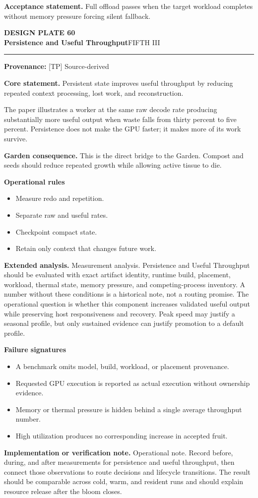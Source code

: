 \documentclass[10pt,letterpaper,oneside]{article}
\newcommand{\prov}[1]{\textcolor{gardenBlue}{\sffamily\footnotesize\textbf{Provenance:} #1}}
\newcommand{\platetitle}[3]{%
  \begin{minipage}[t][0.54in][t]{\textwidth}
  {\sffamily\bfseries\color{gardenDeep}\fontsize{9}{10}\selectfont DESIGN PLATE #1}\\[-1pt]
  {\sffamily\bfseries\color{gardenInk}\fontsize{16.5}{18}\selectfont #2}\hfill{\sffamily\color{gardenGreen}\large #3}
  \end{minipage}\vspace{-2pt}\hrule\vspace{5pt}}
\begin{document}
\begin{acceptbox}
\textbf{Acceptance statement.} Full offload passes when the target workload completes without memory pressure forcing silent fallback.
\end{acceptbox}
\newpage
\platetitle{60}{Persistence and Useful Throughput}{FIFTH III}
\prov{[TP] Source-derived}
\fontsize{8.85}{10.45}\selectfont
\begin{corebox}
\textbf{Core statement.} Persistent state improves useful throughput by reducing repeated context processing, lost work, and reconstruction.
\end{corebox}
The paper illustrates a worker at the same raw decode rate producing substantially more useful output when waste falls from thirty percent to five percent. Persistence does not make the GPU faster; it makes more of its work survive.

\textbf{Garden consequence.} This is the direct bridge to the Garden. Compost and seeds should reduce repeated growth while allowing active tissue to die.

\textbf{Operational rules}
\begin{itemize}
\item Measure redo and repetition.
\item Separate raw and useful rates.
\item Checkpoint compact state.
\item Retain only context that changes future work.
\end{itemize}
\textbf{Extended analysis.} Measurement analysis. Persistence and Useful Throughput should be evaluated with exact artifact identity, runtime build, placement, workload, thermal state, memory pressure, and competing-process inventory. A number without these conditions is a historical note, not a routing promise. The operational question is whether this component increases validated useful output while preserving host responsiveness and recovery. Peak speed may justify a seasonal profile, but only sustained evidence can justify promotion to a default profile.

\textbf{Failure signatures}
\begin{itemize}
\item A benchmark omits model, build, workload, or placement provenance.
\item Requested GPU execution is reported as actual execution without ownership evidence.
\item Memory or thermal pressure is hidden behind a single average throughput number.
\item High utilization produces no corresponding increase in accepted fruit.
\end{itemize}
\textbf{Implementation or verification note.} Operational note. Record before, during, and after measurements for persistence and useful throughput, then connect those observations to route decisions and lifecycle transitions. The result should be comparable across cold, warm, and resident runs and should explain resource release after the bloom closes.
\end{document}
